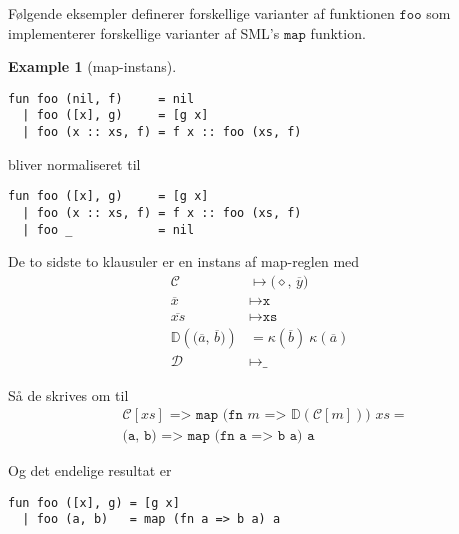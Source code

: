 \documentclass[oneside]{memoir}
\theoremstyle{definition}
\newtheorem{example}{Example}
\begin{document}

Følgende eksempler definerer forskellige varianter af funktionen $\texttt{foo}$
som implementerer forskellige varianter af SML's $\texttt{map}$ funktion.

\begin{example}[\textsf{map}-instans]\
\begin{verbatim}
fun foo (nil, f)     = nil
  | foo ([x], g)     = [g x]
  | foo (x :: xs, f) = f x :: foo (xs, f)
\end{verbatim}

bliver normaliseret til

\begin{verbatim}
fun foo ([x], g)     = [g x]
  | foo (x :: xs, f) = f x :: foo (xs, f)
  | foo _            = nil
\end{verbatim}

De to sidste to klausuler er en instans af \textsf{map}-reglen med
\begin{align}
\mathcal{C} &\mapsto \texttt{($\diamond$, $\overline{y}$)}\\
\overline{x} &\mapsto \texttt{x}\\
\overline{xs} &\mapsto \texttt{xs}\\
\mathbb{D}(\texttt{($\overline{a}$, $\overline{b}$)}) &= \kappa(\overline{b})\
\kappa(\overline{a})\\
\mathcal{D} &\mapsto \texttt{\_}
\end{align}

Så de skrives om til
  \begin{align}
    &\texttt{$\mathcal{C}[xs]$ => map (fn $m$ =>
      $\mathbb{D}(\mathcal{C}[m])$) $xs$} =\\
    &\texttt{(a, b) => map (fn a => b a) a}
  \end{align}

Og det endelige resultat er

\begin{verbatim}
fun foo ([x], g) = [g x]
  | foo (a, b)   = map (fn a => b a) a
\end{verbatim}

\end{example}
\end{document}
